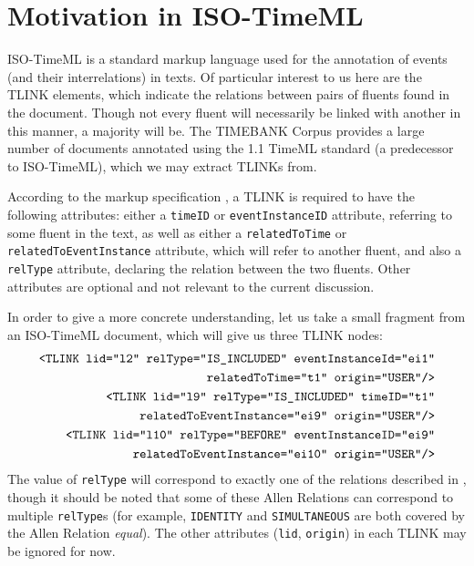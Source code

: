 \documentclass[a4paper,11pt,leqno]{article}
\begin{document}
\section{Motivation in ISO-TimeML}\label{motivation}
ISO-TimeML \citep{pustejovsky2010iso} is a standard markup language used for 
the annotation of events (and their interrelations) in texts. Of particular 
interest to us here are the TLINK elements, which indicate the relations 
between pairs of fluents found in the document. Though not every fluent will 
necessarily be linked with another in this manner, a majority will be. The 
TIMEBANK Corpus \citep{pustejovsky2003timebank} provides a large number of 
documents annotated using the 1.1 TimeML standard (a predecessor to 
ISO-TimeML), which we may extract TLINKs from.

According to the markup specification \citep{timeml2005timeml}, a TLINK is 
required to have the following attributes: either a \texttt{timeID} or 
\texttt{eventInstanceID} attribute, referring to some fluent in the text, as 
well as either a \texttt{relatedToTime} or \texttt{relatedToEventInstance} 
attribute, which will refer to another fluent, and also a \texttt{relType} 
attribute, declaring the relation between the two fluents. Other attributes are 
optional and not relevant to the current discussion.

In order to give a more concrete understanding, let us take a small fragment 
from an ISO-TimeML document, which will give us three TLINK nodes:
\begin{subequations}
\begin{align}
\label{example:tlink1}\mbox{\texttt{<TLINK lid="l2" relType="IS\_INCLUDED" 
		eventInstanceId="ei1"}}\\ 
\mbox{\texttt{relatedToTime="t1" origin="USER"/>}} \notag\\
\label{example:tlink2}\mbox{\texttt{<TLINK lid="l9" relType="IS\_INCLUDED" 
		timeID="t1"}}\\ 
\mbox{\texttt{relatedToEventInstance="ei9" origin="USER"/>}} \notag\\
\label{example:tlink3}\mbox{\texttt{<TLINK lid="l10" relType="BEFORE" 
		eventInstanceID="ei9"}}\\
\mbox{\texttt{relatedToEventInstance="ei10" origin="USER"/>}} \notag
\end{align}
\end{subequations}
The value of \texttt{relType} will correspond to exactly one of the relations 
described in \cite{allen1983maintaining}, though it should be noted that some 
of these Allen Relations can correspond to multiple \texttt{relType}s (for 
example, \texttt{IDENTITY} and \texttt{SIMULTANEOUS} are both covered by the 
Allen Relation \textit{equal}). The other attributes (\texttt{lid}, 
\texttt{origin}) in each TLINK may be ignored for now.
\end{document}

